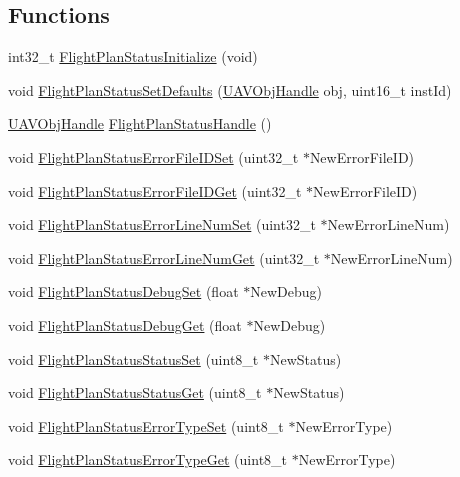\subsection*{\-Functions}
\begin{DoxyCompactItemize}
\item 
int32\-\_\-t \hyperlink{group___flight_plan_status_gad6a692b6f1d078ee0da612bde6e8c1b5}{\-Flight\-Plan\-Status\-Initialize} (void)
\item 
void \hyperlink{group___flight_plan_status_gafc603b2fafbf4ce536a78ee317fb6531}{\-Flight\-Plan\-Status\-Set\-Defaults} (\hyperlink{targets_2_u_a_v_objects_2inc_2uavobjectmanager_8h_a279053e22be53ce9f895043aaeb91e3b}{\-U\-A\-V\-Obj\-Handle} obj, uint16\-\_\-t inst\-Id)
\item 
\hyperlink{targets_2_u_a_v_objects_2inc_2uavobjectmanager_8h_a279053e22be53ce9f895043aaeb91e3b}{\-U\-A\-V\-Obj\-Handle} \hyperlink{group___flight_plan_status_gab840bab9d074df30b08573f685856b74}{\-Flight\-Plan\-Status\-Handle} ()
\item 
void \hyperlink{group___flight_plan_status_gae4470a9a18dfc0a120d29d2ed222fb43}{\-Flight\-Plan\-Status\-Error\-File\-I\-D\-Set} (uint32\-\_\-t $\ast$\-New\-Error\-File\-I\-D)
\item 
void \hyperlink{group___flight_plan_status_gaaa6ed31570bcc655ced5065165efacb6}{\-Flight\-Plan\-Status\-Error\-File\-I\-D\-Get} (uint32\-\_\-t $\ast$\-New\-Error\-File\-I\-D)
\item 
void \hyperlink{group___flight_plan_status_ga095182f4cd842d07e4f1bd9953e1eb78}{\-Flight\-Plan\-Status\-Error\-Line\-Num\-Set} (uint32\-\_\-t $\ast$\-New\-Error\-Line\-Num)
\item 
void \hyperlink{group___flight_plan_status_gafbef11b688c206be0c7e6a654edf5704}{\-Flight\-Plan\-Status\-Error\-Line\-Num\-Get} (uint32\-\_\-t $\ast$\-New\-Error\-Line\-Num)
\item 
void \hyperlink{group___flight_plan_status_ga5a4ca27d8c91b2623fe802c3902c519a}{\-Flight\-Plan\-Status\-Debug\-Set} (float $\ast$\-New\-Debug)
\item 
void \hyperlink{group___flight_plan_status_ga2c13c74a57b0d1ece28f8e20df79caa7}{\-Flight\-Plan\-Status\-Debug\-Get} (float $\ast$\-New\-Debug)
\item 
void \hyperlink{group___flight_plan_status_gaedb9601b5a398d7665687f5aeb17f0d9}{\-Flight\-Plan\-Status\-Status\-Set} (uint8\-\_\-t $\ast$\-New\-Status)
\item 
void \hyperlink{group___flight_plan_status_gafbffc52d2eaf96b1bc5d37f4b2516b09}{\-Flight\-Plan\-Status\-Status\-Get} (uint8\-\_\-t $\ast$\-New\-Status)
\item 
void \hyperlink{group___flight_plan_status_gad0ed715b3e8f4a5475a72273505396ec}{\-Flight\-Plan\-Status\-Error\-Type\-Set} (uint8\-\_\-t $\ast$\-New\-Error\-Type)
\item 
void \hyperlink{group___flight_plan_status_ga8e4dad37d298afd8dd8dad2896b03db0}{\-Flight\-Plan\-Status\-Error\-Type\-Get} (uint8\-\_\-t $\ast$\-New\-Error\-Type)
\end{DoxyCompactItemize}


